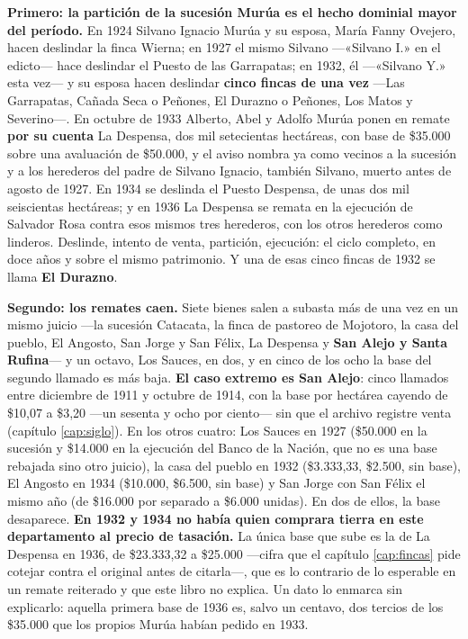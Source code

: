 \textbf{Primero: la partición de la sucesión Murúa es el hecho dominial mayor del período.} En
1924 Silvano Ignacio Murúa y su esposa, María Fanny Ovejero, hacen deslindar la finca
Wierna; en 1927 el mismo Silvano ---«Silvano I.» en el edicto--- hace deslindar el Puesto de las
Garrapatas; en 1932, él ---«Silvano Y.» esta vez--- y su esposa hacen deslindar \textbf{cinco fincas de una vez} ---Las Garrapatas, Cañada Seca o
Peñones, El Durazno o Peñones, Los Matos y Severino---. En octubre de 1933 Alberto, Abel y
Adolfo Murúa ponen en remate \textbf{por su cuenta} La Despensa, dos mil setecientas
hectáreas, con base de \$35.000 sobre una avaluación de \$50.000, y el aviso nombra ya como
vecinos a la sucesión y a los herederos del padre de Silvano Ignacio, también Silvano, muerto antes de agosto de 1927. En 1934 se deslinda el Puesto
Despensa, de unas dos mil seiscientas hectáreas; y en 1936 La Despensa se remata en la
ejecución de Salvador Rosa contra esos mismos tres herederos, con los otros herederos como
linderos. Deslinde, intento de venta, partición, ejecución: el ciclo completo, en doce años y
sobre el mismo patrimonio. Y una de
esas cinco fincas de 1932 se llama \textbf{El Durazno}.

\textbf{Segundo: los remates caen.} Siete bienes salen a subasta más de una vez en un mismo
juicio ---la sucesión Catacata, la finca de pastoreo de Mojotoro, la casa del pueblo,
El Angosto, San Jorge y San Félix, La Despensa y \textbf{San Alejo y Santa Rufina}--- y un octavo, Los Sauces, en dos,
y en cinco de los ocho la base del segundo llamado es más baja. \textbf{El caso extremo es San Alejo}: cinco llamados entre
diciembre de 1911 y octubre de 1914, con la base por hectárea cayendo de \$10,07 a \$3,20
---un sesenta y ocho por ciento--- sin que el archivo registre venta (capítulo
\ref{cap:siglo}). En los otros cuatro: Los Sauces en 1927 (\$50.000 en la sucesión y
\$14.000 en la ejecución del Banco de la Nación, que no es una base rebajada sino otro juicio), la casa del pueblo en 1932 (\$3.333,33, \$2.500, sin base), El Angosto en 1934
(\$10.000, \$6.500, sin base) y San Jorge con San Félix el mismo año (de \$16.000 por separado
a \$6.000 unidas). En dos de ellos, la base desaparece. \textbf{En 1932 y 1934 no había quien comprara
tierra en este departamento al precio de tasación.} La única base que sube es la de La Despensa
en 1936, de \$23.333,32 a \$25.000 ---cifra que el capítulo \ref{cap:fincas} pide cotejar contra el original antes de citarla---, que es lo contrario de lo esperable en un remate reiterado y
que este libro no explica. Un dato lo enmarca sin explicarlo: aquella primera base de 1936 es,
salvo un centavo, dos tercios de los \$35.000 que los propios Murúa habían pedido en 1933.

